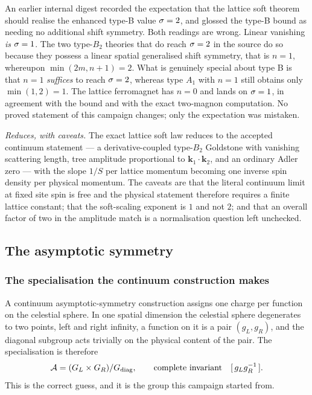 \begin{remark}
\label{rem:sigma-correction}
An earlier internal digest recorded the expectation that the lattice soft
theorem should realise the enhanced type-B value $\sigma=2$, and glossed the
type-B bound as needing no additional shift symmetry. Both readings are wrong.
Linear vanishing \emph{is} $\sigma=1$. The two type-$B_2$ theories that do
reach $\sigma=2$ in the source do so because they possess a linear spatial
generalised shift symmetry, that is $n=1$, whereupon
$\min(2m,n+1)=2$. What is genuinely special about type B is that $n=1$
\emph{suffices} to reach $\sigma=2$, whereas type $A_1$ with $n=1$ still
obtains only $\min(1,2)=1$. The lattice ferromagnet has $n=0$ and lands on
$\sigma=1$, in agreement with the bound and with the exact two-magnon
computation. No proved statement of this campaign changes; only the expectation
was mistaken.
\end{remark}

\begin{observation}
\label{obs:verdict-soft}
\emph{Reduces, with caveats.} The exact lattice soft law reduces to the accepted
continuum statement --- a derivative-coupled type-$B_2$ Goldstone with vanishing
scattering length, tree amplitude proportional to $\bm k_1\cdot\bm k_2$, and an
ordinary Adler zero --- with the slope $1/S$ per lattice momentum becoming one
inverse spin density per physical momentum. The caveats are that the literal
continuum limit at fixed site spin is free and the physical statement therefore
requires a finite lattice constant; that the soft-scaling exponent is $1$ and
not $2$; and that an overall factor of two in the amplitude match is a
normalisation question left unchecked.
\end{observation}

\subsection{The asymptotic symmetry}
\label{sec:reduction-symmetry}

\subsubsection*{The specialisation the continuum construction makes}

A continuum asymptotic-symmetry construction assigns one charge per function on
the celestial sphere. In one spatial dimension the celestial sphere degenerates
to two points, left and right infinity, a function on it is a pair
$(g_L,g_R)$, and the diagonal subgroup acts trivially on the physical content of
the pair. The specialisation is therefore
\begin{equation}
  \mathcal{A}=(G_L\times G_R)/G_{\mathrm{diag}},
  \qquad\text{complete invariant}\quad [\,g_Lg_R^{-1}\,].
  \label{eq:red-naive-A}
\end{equation}
This is the correct guess, and it is the group this campaign started from.

